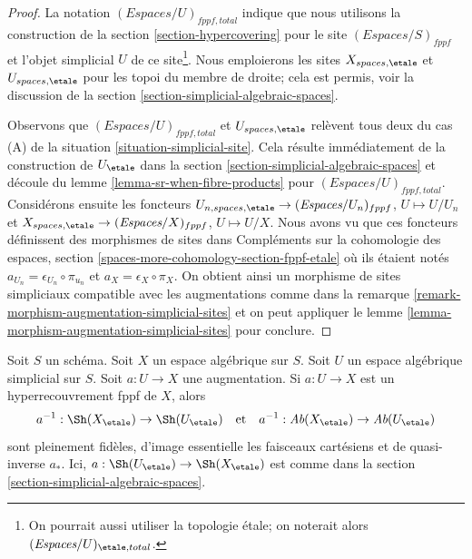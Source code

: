 \begin{proof}
La notation $(\textit{Espaces}/U)_{fppf, total}$ indique que
nous utilisons la construction de
la section \ref{section-hypercovering}
pour le site $(\textit{Espaces}/S)_{fppf}$ et l'objet simplicial
$U$ de ce site\footnote{On pourrait aussi
utiliser la topologie \'etale; on noterait alors
$(\textit{Espaces}/U)_{\etale, total}$.}.
Nous emploierons les sites $X_{spaces, \etale}$ et $U_{spaces, \etale}$
pour les topoi du membre de droite; cela est permis,
voir la discussion de la section \ref{section-simplicial-algebraic-spaces}.

\medskip\noindent
Observons que $(\textit{Espaces}/U)_{fppf, total}$ et
$U_{spaces, \etale}$
relèvent tous deux du cas (A) de la situation \ref{situation-simplicial-site}.
Cela résulte immédiatement de la construction de
$U_\etale$ dans la section \ref{section-simplicial-algebraic-spaces}
et découle du lemme \ref{lemma-sr-when-fibre-products}
pour $(\textit{Espaces}/U)_{fppf, total}$.
Considérons ensuite les foncteurs
$U_{n, spaces, \etale} \to (\textit{Espaces}/U_n)_{fppf}$, $U \mapsto U/U_n$
et
$X_{spaces, \etale} \to (\textit{Espaces}/X)_{fppf}$, $U \mapsto U/X$.
Nous avons vu que ces foncteurs définissent des morphismes de sites dans
Compléments sur la cohomologie des espaces, section
\ref{spaces-more-cohomology-section-fppf-etale}
où ils étaient notés $a_{U_n} = \epsilon_{U_n} \circ \pi_{u_n}$
et $a_X = \epsilon_X \circ \pi_X$.
On obtient ainsi un morphisme de sites simpliciaux compatible avec les augmentations
comme dans la remarque \ref{remark-morphism-augmentation-simplicial-sites}
et on peut appliquer le lemme
\ref{lemma-morphism-augmentation-simplicial-sites} pour conclure.
\end{proof}

\begin{lemma}
\label{lemma-descent-sheaves-for-fppf-hypercovering}
Soit $S$ un schéma. Soit $X$ un espace algébrique sur $S$.
Soit $U$ un espace algébrique simplicial sur $S$. Soit $a : U \to X$
une augmentation. Si $a : U \to X$ est un hyperrecouvrement fppf de $X$,
alors
$$
a^{-1} : \Sh(X_\etale) \to \Sh(U_\etale)
\quad\text{et}\quad
a^{-1} : \textit{Ab}(X_\etale) \to \textit{Ab}(U_\etale)
$$
sont pleinement fidèles, d'image essentielle les faisceaux cartésiens et
de quasi-inverse $a_*$. Ici, $a : \Sh(U_\etale) \to \Sh(X_\etale)$
est comme dans la section \ref{section-simplicial-algebraic-spaces}.
\end{lemma}

